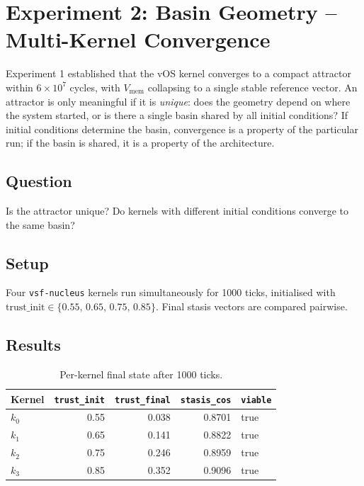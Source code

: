 \documentclass[11pt, a4paper]{article}
\newcommand{\vOS}{\textsf{vOS}}
\newcommand{\nucleus}{\texttt{vsf-nucleus}}
\begin{document}
\section{Experiment 2: Basin Geometry -- Multi-Kernel Convergence}
\label{sec:geometry}

Experiment 1 established that the \vOS{} kernel converges to a compact
attractor within $6\times 10^7$ cycles, with $V_\text{mem}$ collapsing
to a single stable reference vector.
An attractor is only meaningful if it is \emph{unique}: does the geometry
depend on where the system started, or is there a single basin shared by
all initial conditions?
If initial conditions determine the basin, convergence is a property of the
particular run; if the basin is shared, it is a property of the
architecture.

\subsection*{Question} Is the attractor unique?
Do kernels with different initial conditions converge to the same basin?

\subsection{Setup}

Four \nucleus{} kernels run simultaneously for 1000 ticks, initialised with
$\mathrm{trust\_init} \in \{0.55,\, 0.65,\, 0.75,\, 0.85\}$.
Final stasis vectors are compared pairwise.

\subsection{Results}

\begin{table}[!htb]
\centering
\begin{tabular}{lrrrl}
\toprule
Kernel & \texttt{trust\_init} & \texttt{trust\_final} & \texttt{stasis\_cos} & \texttt{viable} \\
\midrule
$k_0$ & 0.55 & 0.038 & 0.8701 & true \\
$k_1$ & 0.65 & 0.141 & 0.8822 & true \\
$k_2$ & 0.75 & 0.246 & 0.8959 & true \\
$k_3$ & 0.85 & 0.352 & 0.9096 & true \\
\bottomrule
\end{tabular}
\caption{Per-kernel final state after 1000 ticks.}
\label{tab:multikernel}
\end{table}
\end{document}
